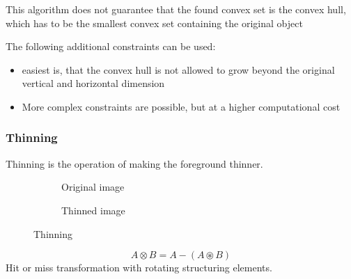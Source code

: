 This algorithm does not guarantee that the found convex set is the convex hull, which has to be the smallest convex set containing the original object

The following additional constraints can be used:
\begin{itemize}
\item easiest is, that the convex hull is not allowed to grow beyond the original vertical and horizontal dimension
\item More complex constraints are possible, but at a higher computational cost
\end{itemize}

\subsubsection{Thinning}
Thinning is the operation of making the foreground thinner.
\begin{figure}[h]
	\centering
	\begin{subfigure}[b]{0.45\textwidth}
		\centering
		\caption{Original image}
	\end{subfigure}
	\begin{subfigure}[b]{0.45\textwidth}
		\centering
		\caption{Thinned image}
	\end{subfigure}
	\caption{Thinning}
\end{figure}
	\[
		A \otimes  B = A - (A \circledast B)	
	\]	
Hit or miss transformation with rotating structuring elements.\\

